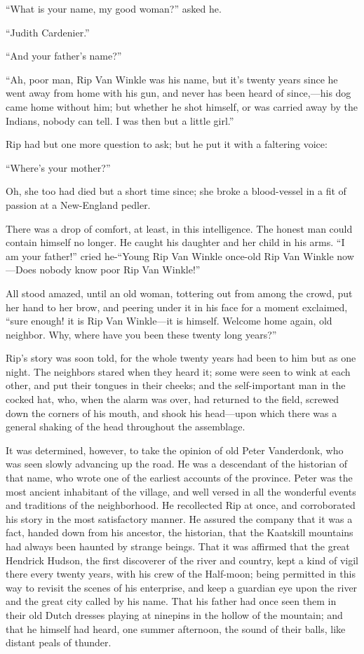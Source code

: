“What is your name, my good woman?” asked he.

“Judith Cardenier.”

“And your father’s name?”

“Ah, poor man, Rip Van Winkle was his name, but it’s twenty years since he went away from home with his gun, and never has been heard of since,—his dog came home without him; but whether he shot himself, or was carried away by the Indians, nobody can tell. I was then but a little girl.”

Rip had but one more question to ask; but he put it with a faltering voice:

“Where’s your mother?”

Oh, she too had died but a short time since; she broke a blood-vessel in a fit of passion at a New-England pedler.

There was a drop of comfort, at least, in this intelligence. The honest man could contain himself no longer. He caught his daughter and her child in his arms. “I am your father!” cried he-“Young Rip Van Winkle once-old Rip Van Winkle now—Does nobody know poor Rip Van Winkle!”

All stood amazed, until an old woman, tottering out from among the crowd, put her hand to her brow, and peering under it in his face for a moment exclaimed, “sure enough! it is Rip Van Winkle—it is himself. Welcome home again, old neighbor. Why, where have you been these twenty long years?”

Rip’s story was soon told, for the whole twenty years had been to him but as one night. The neighbors stared when they heard it; some were seen to wink at each other, and put their tongues in their cheeks; and the self-important man in the cocked hat, who, when the alarm was over, had returned to the field, screwed down the corners of his mouth, and shook his head—upon which there was a general shaking of the head throughout the assemblage.

It was determined, however, to take the opinion of old Peter Vanderdonk, who was seen slowly advancing up the road. He was a descendant of the historian of that name, who wrote one of the earliest accounts of the province. Peter was the most ancient inhabitant of the village, and well versed in all the wonderful events and traditions of the neighborhood. He recollected Rip at once, and corroborated his story in the most satisfactory manner. He assured the company that it was a fact, handed down from his ancestor, the historian, that the Kaatskill mountains had always been haunted by strange beings. That it was affirmed that the great Hendrick Hudson, the first discoverer of the river and country, kept a kind of vigil there every twenty years, with his crew of the Half-moon; being permitted in this way to revisit the scenes of his enterprise, and keep a guardian eye upon the river and the great city called by his name. That his father had once seen them in their old Dutch dresses playing at ninepins in the hollow of the mountain; and that he himself had heard, one summer afternoon, the sound of their balls, like distant peals of thunder.

